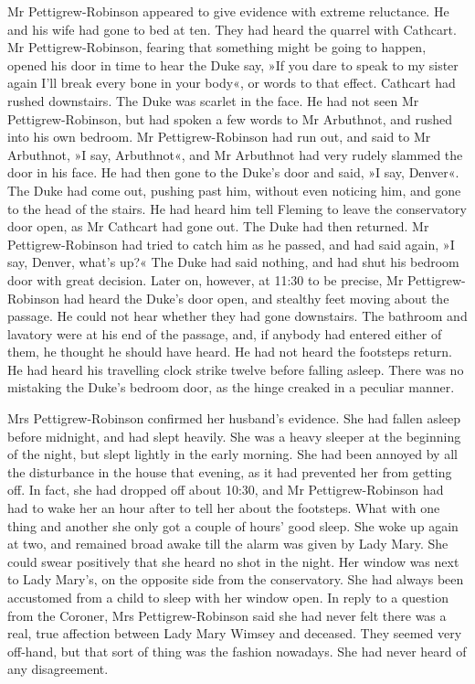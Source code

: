 Mr Pettigrew-Robinson appeared to give evidence with extreme reluctance. He and his wife had gone to bed at ten. They had heard the quarrel with Cathcart. Mr Pettigrew-Robinson, fearing that something might be going to happen, opened his door in time to hear the Duke say, »If you dare to speak to my sister again I'll break every bone in your body«, or words to that effect. Cathcart had rushed downstairs. The Duke was scarlet in the face. He had not seen Mr  Pettigrew-Robinson, but had spoken a few words to Mr Arbuthnot, and rushed into his own bedroom. Mr Pettigrew-Robinson had run out, and said to Mr Arbuthnot, »I say, Arbuthnot«, and Mr Arbuthnot had very rudely slammed the door in his face. He had then gone to the Duke's door and said, »I say, Denver«. The Duke had come out, pushing past him, without even noticing him, and gone to the head of the stairs. He had heard him tell Fleming to leave the conservatory door open, as Mr Cathcart had gone out. The Duke had then returned. Mr  Pettigrew-Robinson had tried to catch him as he passed, and had said again, »I say, Denver, what's up?« The Duke had said nothing, and had shut his bedroom door with great decision. Later on, however, at 11:30 to be precise, Mr Pettigrew-Robinson had heard the Duke's door open, and stealthy feet moving about the passage. He could not hear whether they had gone downstairs. The bathroom and lavatory were at his end of the passage, and, if anybody had entered either of them, he thought he should have heard. He had not heard the footsteps return. He had heard his travelling clock strike twelve before falling asleep. There was no mistaking the Duke's bedroom door, as the hinge creaked in a peculiar manner.

Mrs Pettigrew-Robinson confirmed her husband's evidence. She had fallen asleep before midnight, and had slept heavily. She was a heavy sleeper at the beginning of the night, but slept lightly in the early morning. She had been annoyed by all the disturbance in the house that evening, as it had prevented her from getting off. In fact, she had dropped off about 10:30, and Mr Pettigrew-Robinson had had to wake her an hour after to tell her about the footsteps. What with one thing and another she only got a couple of hours' good sleep. She woke up again at two, and remained broad awake till the alarm was given by Lady Mary. She could swear positively that she heard no shot in the night. Her window was next to Lady Mary's, on the opposite side from the conservatory. She had always been accustomed from a child to sleep with her window open. In reply to a question from the Coroner, Mrs  Pettigrew-Robinson said she had never felt there was a real, true affection between Lady Mary Wimsey and deceased. They seemed very off-hand, but that sort of thing was the fashion nowadays. She had never heard of any disagreement.

